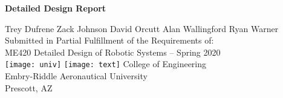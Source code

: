 \begin{titlepage}
\flushleft
\doublespacing\center
\Large
\null\vfill

\textbf{Detailed Design Report}
\vspace{4ex}\normalsize

Trey Dufrene \hfill Zack Johnson \hfill David Orcutt \hfill Alan Wallingford \hfill Ryan Warner
\vfill
\vspace{0.8cm}
  \normalsize
  Submitted in Partial Fulfillment of the Requirements of: \\
  ME420 Detailed Design of Robotic Systems -- Spring 2020\\

  \vspace{0.6cm}
  \texttt{[image: univ]}
  \texttt{[image: text]}
  \vspace{.2ex}\onehalfspacing
  College of Engineering\\
  Embry-Riddle Aeronautical University\\
  Prescott, AZ\\
\end{titlepage}


